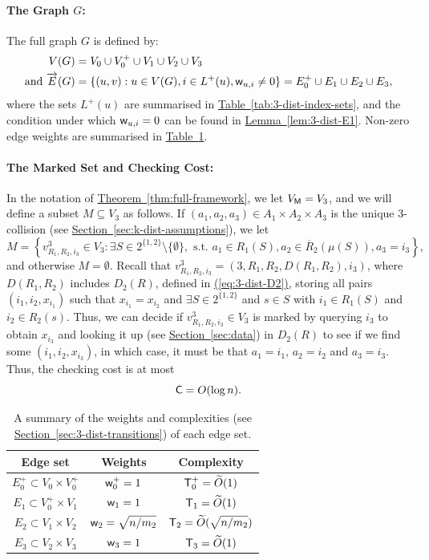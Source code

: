 \documentclass{theoretics}
\newcommand{\eq}[1]{\hyperref[eq:#1]{(\ref*{eq:#1})}}
\renewcommand{\sec}[1]{\hyperref[sec:#1]{Section~\ref*{sec:#1}}}
\newcommand{\thm}[1]{\hyperref[thm:#1]{Theorem~\ref*{thm:#1}}}
\newcommand{\lem}[1]{\hyperref[lem:#1]{Lemma~\ref*{lem:#1}}}
\newcommand{\tabl}[1]{\hyperref[tab:#1]{Table~\ref*{tab:#1}}}
\renewcommand{\>}{\rangle}
\newcommand{\<}{\langle}
\renewcommand{\(}{\left(}
\renewcommand{\)}{\right)}
\def\w{{\sf w}}
\begin{document}
\paragraph{The Graph $G$:} The full graph $G$ is defined by:
\begin{align*}
V(G)&=V_0\cup V_0^+ \cup V_1\cup V_2\cup V_3\\
\mbox{and }\overrightarrow{E}(G) &= \{(u,v):u\in V(G),i\in L^+(u), \w_{u,i}\neq 0\} = E_0^+ \cup E_1 \cup E_2 \cup E_3,
\end{align*}
where the sets $L^+(u)$ are summarised in \tabl{3-dist-index-sets}, and the condition under which $\w_{u,i}=0$ can be found in \lem{3-dist-E1}. Non-zero edge weights are summarised in \tabl{3-dist-weights}.

\paragraph{The Marked Set and Checking Cost:}  In the notation of \thm{full-framework}, we let $V_{\sf M}=V_3$, and we will define a subset $M\subseteq V_3$ as follows. 
If $(a_1,a_2,a_3)\in A_1\times A_2\times A_3$ is the unique 3-collision (see \sec{k-dist-assumptions}), we let 
\begin{equation}
M = \left\{v^3_{R_1,R_2,i_3}\in V_3: \exists S\in 2^{\{1,2\}}\setminus\{\emptyset\}, \mbox{ s.t. }a_1\in R_1(S),a_2\in \overline{R}_2(\mu(S)), a_3=i_3\right\},\label{eq:3-dist-M}
\end{equation}
and otherwise $M=\emptyset$.
Recall that $v^3_{R_1,R_2,i_3}=(3,R_1,R_2,D(R_1,R_2),i_3)$, where $D(R_1,R_2)$ includes $D_2(R)$, defined in \eq{3-dist-D2}, storing all pairs $(i_1,i_2,x_{i_1})$ such that $x_{i_1}=x_{i_2}$ and $\exists S\in 2^{\{1,2\}}$ and $s\in S$ with $i_1\in R_1(S)$ and $i_2\in R_2(s)$.
Thus, we can decide if $v^3_{R_1,R_2,i_3}\in V_3$ is marked by querying $i_3$ to obtain $x_{i_3}$ and looking it up (see \sec{data}) in $D_2(R)$ to see if we find some $(i_1,i_2,x_{i_3})$, in which case, it must be that $a_1=i_1$, $a_2=i_2$ and $a_3=i_3$. Thus, the checking cost is at most
\begin{equation}
{\sf C}=O(\log n).\label{eq:3-dist-C}
\end{equation}

\begin{table}
\renewcommand{\arraystretch}{1.5}
\centering
\begin{tabular}{|c|c|c|}
\hline
Edge set & Weights & Complexity\\
\hline
\hline
$E_0^+\subset V_0\times V_0^+$ & $\w_0^+=1$ & ${\sf T}_0^+=\widetilde{O}(1)$\\
\hline
$E_1\subset V_0^+\times V_1$ & $\w_1=1$ & ${\sf T}_1=\widetilde{O}(1)$\\
\hline
$E_2\subset V_1\times V_2$ & $\w_2=\sqrt{n/m_2}$ & ${\sf T}_2=\widetilde{O}(\sqrt{n/m_2})$\\
\hline
$E_3\subset V_2\times V_3$ & $\w_3=1$ & ${\sf T}_3=\widetilde{O}(1)$\\
\hline
\end{tabular}
\caption{A summary of the weights and complexities (see \sec{3-dist-transitions}) of each edge set.}\label{tab:3-dist-weights}
\end{table}
\end{document}
